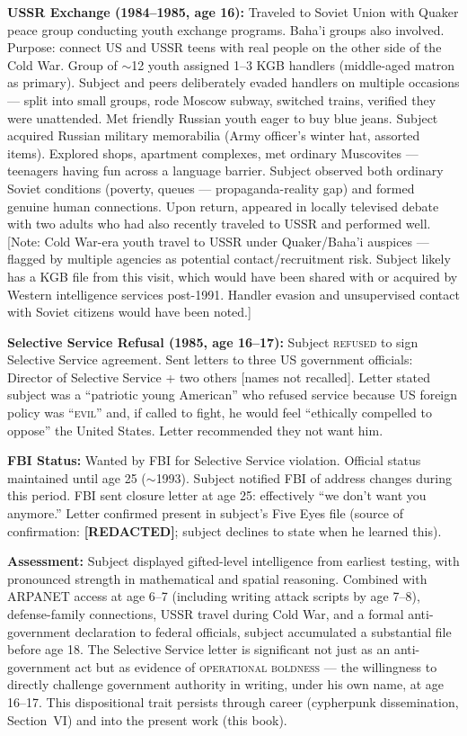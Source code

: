 \textbf{USSR Exchange (1984--1985, age 16):} Traveled to Soviet Union with Quaker peace group conducting youth exchange programs. Baha'i groups also involved. Purpose: connect US and USSR teens with real people on the other side of the Cold War. Group of $\sim$12 youth assigned 1--3 KGB handlers (middle-aged matron as primary). Subject and peers deliberately evaded handlers on multiple occasions --- split into small groups, rode Moscow subway, switched trains, verified they were unattended. Met friendly Russian youth eager to buy blue jeans. Subject acquired Russian military memorabilia (Army officer's winter hat, assorted items). Explored shops, apartment complexes, met ordinary Muscovites --- teenagers having fun across a language barrier. Subject observed both ordinary Soviet conditions (poverty, queues --- propaganda-reality gap) and formed genuine human connections. Upon return, appeared in locally televised debate with two adults who had also recently traveled to USSR and performed well. [Note: Cold War-era youth travel to USSR under Quaker/Baha'i auspices --- flagged by multiple agencies as potential contact/recruitment risk. Subject likely has a KGB file from this visit, which would have been shared with or acquired by Western intelligence services post-1991. Handler evasion and unsupervised contact with Soviet citizens would have been noted.]

\textbf{Selective Service Refusal (1985, age 16--17):} Subject \textsc{refused} to sign Selective Service agreement. Sent letters to three US government officials: Director of Selective Service + two others [names not recalled]. Letter stated subject was a ``patriotic young American'' who refused service because US foreign policy was ``\textsc{evil}'' and, if called to fight, he would feel ``ethically compelled to oppose'' the United States. Letter recommended they not want him.

\textbf{FBI Status:} Wanted by FBI for Selective Service violation. Official status maintained until age 25 ($\sim$1993). Subject notified FBI of address changes during this period. FBI sent closure letter at age 25: effectively ``we don't want you anymore.'' Letter confirmed present in subject's Five Eyes file (source of confirmation: \textbf{[REDACTED]}; subject declines to state when he learned this).

\textbf{Assessment:} Subject displayed gifted-level intelligence from earliest testing, with pronounced strength in mathematical and spatial reasoning. Combined with ARPANET access at age 6--7 (including writing attack scripts by age 7--8), defense-family connections, USSR travel during Cold War, and a formal anti-government declaration to federal officials, subject accumulated a substantial file before age 18. The Selective Service letter is significant not just as an anti-government act but as evidence of \textsc{operational boldness} --- the willingness to directly challenge government authority in writing, under his own name, at age 16--17. This dispositional trait persists through career (cypherpunk dissemination, Section~VI) and into the present work (this book).

